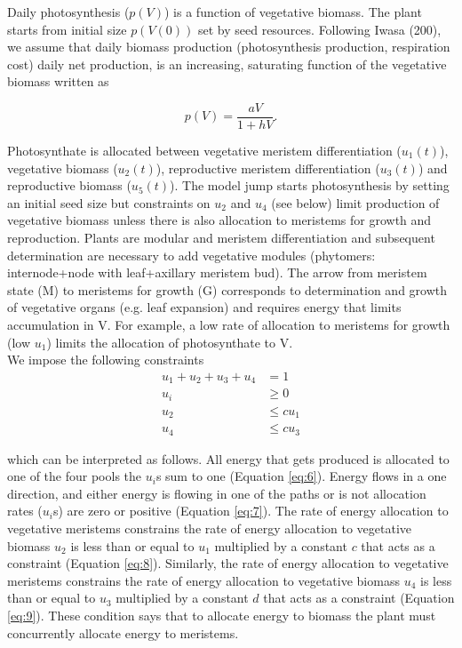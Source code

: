 \documentclass[12pt, oneside]{article}   	%
\begin{document}
\noindent Daily photosynthesis ($p(V)$) is a function of vegetative biomass. The plant starts from initial size $p(V(0))$ set by seed resources. Following Iwasa (200), we assume that daily biomass production (photosynthesis production, respiration cost) daily net production, is an increasing, saturating function of the vegetative biomass written as

\begin{equation} p(V) = \frac{aV}{1 + hV}. \label{eq:5}  \end{equation}

\noindent Photosynthate is allocated between vegetative meristem differentiation ($u_1(t)$), vegetative biomass ($u_2(t)$), reproductive meristem differentiation ($u_3(t)$) and reproductive biomass ($u_5(t)$). The model jump starts photosynthesis by setting an initial seed size but constraints on $u_2$ and $u_4$ (see below) limit production of vegetative biomass unless there is also allocation to meristems for growth and reproduction. Plants are modular and meristem differentiation and subsequent determination are necessary to add vegetative modules (phytomers: internode+node with leaf+axillary meristem bud). The arrow from meristem state (M) to meristems for growth (G) corresponds to determination and growth of vegetative organs (e.g. leaf expansion) and requires energy that limits accumulation in V. For example, a low rate of allocation to meristems for growth (low $u_1$) limits the allocation of photosynthate to V. \\

\noindent We impose the following constraints
\begin{align}
 u_1 + u_2 + u_3 + u_4 & = 1 \label{eq:6} \\ 
 u_i & \geq 0 \label{eq:7}  \\
 u_2 & \leq c u_1 \label{eq:8}  \\
 u_4 & \leq c u_3 \label{eq:9}  
\end{align} 

\noindent which can be interpreted as follows. All energy that gets produced is allocated to one of the four pools \textemdash the $u_i$s sum to one (Equation \ref{eq:6}). Energy flows in a one direction, and either energy is flowing in one of the paths or is not \textemdash allocation rates ($u_i$s) are zero or positive (Equation \ref{eq:7}). The rate of energy allocation to vegetative meristems constrains the rate of energy allocation to vegetative biomass \textemdash $u_2$ is less than or equal to $u_1$ multiplied by a constant $c$ that acts as a constraint (Equation \ref{eq:8}). Similarly, the rate of energy allocation to vegetative meristems constrains the rate of energy allocation to vegetative biomass \textemdash $u_4$ is less than or equal to $u_3$ multiplied by a constant $d$ that acts as a constraint (Equation \ref{eq:9}). These condition says that to allocate energy to biomass the plant must concurrently allocate energy to meristems. \\
    
\end{document}

